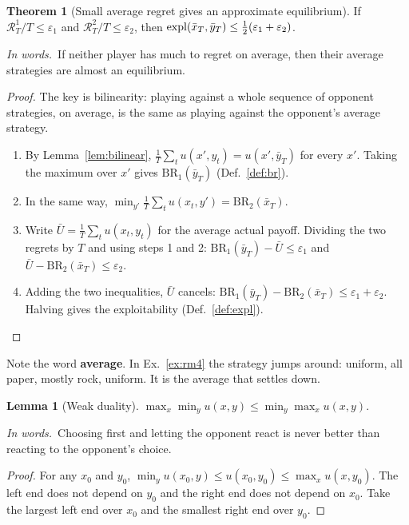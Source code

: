 \documentclass[11pt]{article}
\theoremstyle{definition}
\newtheorem{lemma}[definition]{Lemma}
\newtheorem{theorem}[definition]{Theorem}
\newcommand{\inwords}{\par\smallskip\noindent\textit{In words.}\ }
\newcommand{\Def}[1]{Def.~\ref{#1}}\newcommand{\Lem}[1]{Lemma~\ref{#1}}\newcommand{\Thm}[1]{Thm.~\ref{#1}}
\newcommand{\Ex}[1]{Ex.~\ref{#1}}\newcommand{\Rem}[1]{Remark~\ref{#1}}\newcommand{\Alg}[1]{Alg.~\ref{#1}}\newcommand{\Cor}[1]{Cor.~\ref{#1}}
\begin{document}
\begin{theorem}[Small average regret gives an approximate equilibrium]\label{thm:folk}
If $\mathcal R^1_T/T\le\varepsilon_1$ and $\mathcal R^2_T/T\le\varepsilon_2$, then $\mathrm{expl}(\bar x_T,\bar y_T)\le\tfrac12(\varepsilon_1+\varepsilon_2)$.
\inwords If neither player has much to regret on average, then their average strategies are almost an equilibrium.
\end{theorem}
\begin{proof}
The key is bilinearity: playing against a whole sequence of opponent strategies, on average, is the same as playing
against the opponent's average strategy.
\begin{enumerate}[nosep]
\item By \Lem{lem:bilinear}, $\tfrac1T\sum_tu(x',y_t)=u(x',\bar y_T)$ for every $x'$. Taking the maximum over $x'$ gives
$\mathrm{BR}_1(\bar y_T)$ (\Def{def:br}).
\item In the same way, $\min_{y'}\tfrac1T\sum_tu(x_t,y')=\mathrm{BR}_2(\bar x_T)$.
\item Write $\bar U=\tfrac1T\sum_tu(x_t,y_t)$ for the average actual payoff. Dividing the two regrets by $T$ and using
steps 1 and 2: $\mathrm{BR}_1(\bar y_T)-\bar U\le\varepsilon_1$ and $\bar U-\mathrm{BR}_2(\bar x_T)\le\varepsilon_2$.
\item Adding the two inequalities, $\bar U$ cancels: $\mathrm{BR}_1(\bar y_T)-\mathrm{BR}_2(\bar x_T)\le\varepsilon_1+\varepsilon_2$. Halving
gives the exploitability (\Def{def:expl}).\qedhere
\end{enumerate}
\end{proof}
Note the word \textbf{average}. In \Ex{ex:rm4} the strategy jumps around: uniform, all paper, mostly rock, uniform. It is
the average that settles down.

\begin{lemma}[Weak duality]\label{lem:weak}
$\max_x\min_yu(x,y)\le\min_y\max_xu(x,y)$.
\inwords Choosing first and letting the opponent react is never better than reacting to the opponent's choice.
\end{lemma}
\begin{proof}
For any $x_0$ and $y_0$, $\min_yu(x_0,y)\le u(x_0,y_0)\le\max_xu(x,y_0)$. The left end does not depend on $y_0$ and the
right end does not depend on $x_0$. Take the largest left end over $x_0$ and the smallest right end over $y_0$.
\end{proof}
\end{document}
